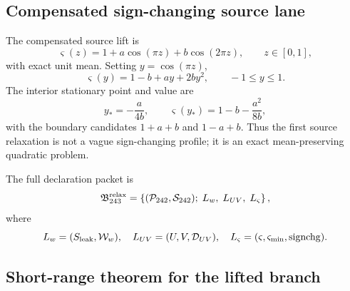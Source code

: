 \subsection{Compensated sign-changing source lane}
\label{subsec:app-part08-compensated-source-lane}

The compensated source lift is
\begin{equation}
\label{eq:app-part08-stage243-varsigma}
\varsigma(z)=1+a\cos(\pi z)+b\cos(2\pi z),
\qquad
z\in[0,1],
\end{equation}
with exact unit mean.  Setting \(y=\cos(\pi z)\),
\begin{equation}
\label{eq:app-part08-stage243-varsigma-quadratic}
\varsigma(y)=1-b+ay+2by^2,
\qquad
-1\le y\le 1.
\end{equation}
The interior stationary point and value are
\begin{equation}
\label{eq:app-part08-stage243-varsigma-min}
y_*=-\frac{a}{4b},
\qquad
\varsigma(y_*)=1-b-\frac{a^2}{8b},
\end{equation}
with the boundary candidates \(1+a+b\) and \(1-a+b\).  Thus the first source relaxation is not a vague sign-changing profile; it is an exact mean-preserving quadratic problem.

The full declaration packet is
\begin{equation}
\label{eq:app-part08-stage243-relaxed-branch}
\mathfrak B_{243}^{\rm relax}
=
\left\{(\mathcal P_{242},\mathcal S_{242});\;L_w,\;L_{UV},\;L_\varsigma\right\},
\end{equation}
where
\begin{equation}
\label{eq:app-part08-stage243-lanes}
L_w=(S_{\rm leak},\mathcal W_w),
\quad
L_{UV}=(U,V,\mathcal D_{UV}),
\quad
L_\varsigma=(\varsigma,\varsigma_{\min},\mathrm{signchg}).
\end{equation}

\subsection{Short-range theorem for the lifted branch}
\label{subsec:app-part08-short-range-theorem}


